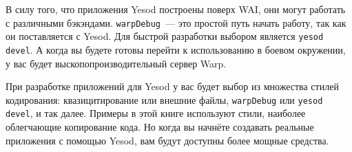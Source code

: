 В силу того, что приложения Yesod построены поверх WAI, они могут работать с различными
бэкэндами. \lstinline!warpDebug!~--- это простой путь начать работу, так как он
поставляется с Yesod. Для быстрой разработки выбором является \lstinline!yesod devel!. А
когда вы будете готовы перейти к использованию в боевом окружении, у вас будет
выскопопроизводительный сервер Warp.

При разработке приложений для Yesod у вас будет выбор из множества стилей кодирования:
квазицитирование или внешние файлы, \lstinline{warpDebug} или \lstinline'yesod devel', и
так далее. Примеры в этой книге используют стили, наиболее облегчающие копирование кода. Но когда вы начнёте создавать реальные приложения с помощью
Yesod, вам будут доступны более мощные средства.
